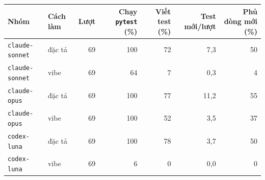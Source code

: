 \begin{tabular}{llrrrrr}
\toprule
Nhóm & Cách làm & Lượt & Chạy \texttt{pytest} (\%) & Viết test (\%) & Test mới/lượt & Phủ dòng mới (\%) \\
\midrule
\texttt{claude-sonnet} & đặc tả & 69 & 100 & 72 & 7,3 & 50 \\
\texttt{claude-sonnet} & vibe & 69 & 64 & 7 & 0,3 & 4 \\
\texttt{claude-opus} & đặc tả & 69 & 100 & 77 & 11,2 & 55 \\
\texttt{claude-opus} & vibe & 69 & 100 & 52 & 3,5 & 37 \\
\texttt{codex-luna} & đặc tả & 69 & 100 & 78 & 3,7 & 50 \\
\texttt{codex-luna} & vibe & 69 & 6 & 0 & 0,0 & 0 \\
\bottomrule
\end{tabular}
